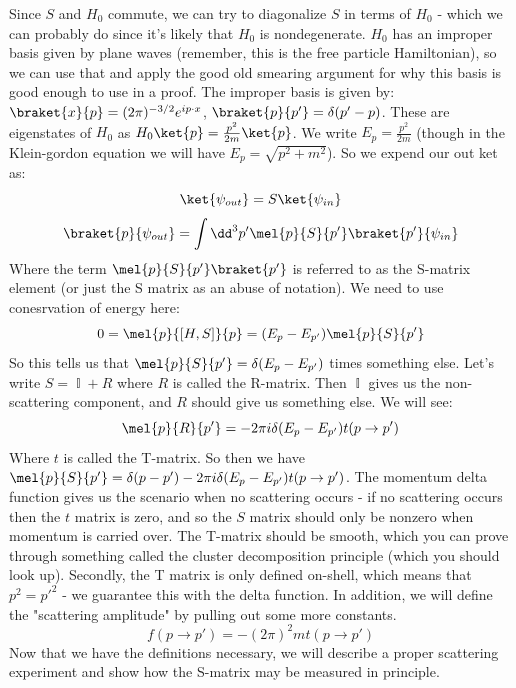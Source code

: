 \documentclass{article}
\DeclareMathOperator{\II}{\mathbb{I}}
\begin{document}
Since $S$ and $H_0$ commute, we can try to diagonalize $S$ in terms of $H_0$ - which we can probably do since it's likely that $H_0$ is nondegenerate. $H_0$ has an improper basis given by plane waves (remember, this is the free particle Hamiltonian), so we can use that and apply the good old smearing argument for why this basis is good enough to use in a proof. The improper basis is given by: $\braket{x}{p} = (2\pi)^{-3/2}e^{ip\cdot x}$, $\braket{p}{p'} = \delta(p'-p)$. These are eigenstates of $H_0$ as $H_0\ket{p}=\frac{p^2}{2m}\ket{p}$. We write $E_p = \frac{p^2}{2m}$ (though in the Klein-gordon equation we will have $E_p=\sqrt{p^2+m^2}$). So we expend our out ket as:
\[\ket{\psi_{out}} = S\ket{\psi_{in}}\]
\begin{equation}\label{scatter1}\braket{p}{\psi_{out}} = \int \dd^3 p' \mel{p}{S}{p'}\braket{p'}{\psi_{in}}\end{equation}
Where the term $ \mel{p}{S}{p'}\braket{p'}$ is referred to as the S-matrix element (or just the S matrix as an abuse of notation). We need to use conesrvation of energy here:
\[0 = \mel{p}{[H,S]}{p} = (E_{p}-E_{p'})\mel{p}{S}{p'}\]
So this tells us that $\mel{p}{S}{p'}=\delta(E_p-E_{p'})$ times something else. Let's write $S = \II + R$ where $R$ is called the R-matrix. Then $\II$ gives us the non-scattering component, and $R$ should give us something else. We will see:
\begin{equation}\label{scatter2}\mel{p}{R}{p'}=-2\pi i \delta(E_p-E_{p'})t(p \to p')\end{equation}
Where $t$ is called the T-matrix. So then we have $\mel{p}{S}{p'}=\delta(p-p')-2\pi i \delta(E_p-E_{p'})t(p\to p')$. The momentum delta function gives us the scenario when no scattering occurs - if no scattering occurs then the $t$ matrix is zero, and so the $S$ matrix should only be nonzero when momentum is carried over. The T-matrix should be smooth, which you can prove through something called the cluster decomposition principle (which you should look up). Secondly, the T matrix is only defined on-shell, which means that $p^2=p'^2$ - we guarantee this with the delta function. In addition, we will define the "scattering amplitude" by pulling out some more constants.
\begin{equation}\label{scatter3} f(p \to p') = -(2\pi)^2 m t(p \to p')\end{equation}
Now that we have the definitions necessary, we will describe a proper scattering experiment and show how the S-matrix may be measured in principle.
\pagebreak
\end{document}
